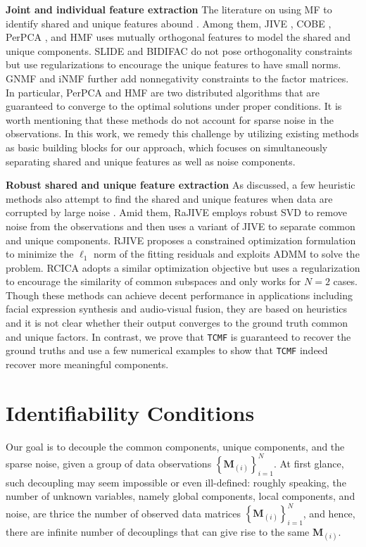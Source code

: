 \documentclass[twoside,11pt]{article}
\def\name{\texttt{TCMF}\xspace}
\newcommand{\matM}{\mathbf{M}}
\begin{document}
\textbf{Joint and individual feature extraction} The literature on using MF to identify shared and unique features abound \citep{jive,cobe, slide,bidifac, groupnmf,inmf, personalizedpca, perdl,hmf}. Among them, JIVE \citep{jive}, COBE \citep{cobe}, PerPCA \citep{personalizedpca},  and HMF \citep{hmf} uses mutually orthogonal features to model the shared and unique components. SLIDE \citep{slide} and BIDIFAC \citep{bidifac} do not pose orthogonality constraints but use regularizations to encourage the unique features to have small norms. GNMF \citep{groupnmf} and iNMF \citep{inmf} further add nonnegativity constraints to the factor matrices. In particular, PerPCA \citep{personalizedpca} and HMF \citep{hmf} are two distributed algorithms that are guaranteed to converge to the optimal solutions under proper conditions. It is worth mentioning that these methods do not account for sparse noise in the observations. In this work, we remedy this challenge by utilizing existing methods as basic building blocks for our approach, which focuses on simultaneously separating shared and unique features as well as noise components.

\textbf{Robust shared and unique feature extraction} As discussed, a few heuristic methods also attempt to find the shared and unique features when data are corrupted by large noise \citep{rjive,rajive,rcica}. Amid them, RaJIVE \citep{rajive} employs robust SVD \citep{robustsvd} to remove noise from the observations and then uses a variant of JIVE \citep{ajive} to separate common and unique components. RJIVE \citep{rjive} proposes a constrained optimization formulation to minimize the $\ell_1$ norm of the fitting residuals and exploits ADMM to solve the problem. RCICA \citep{rcica} adopts a similar optimization objective but uses a regularization to encourage the similarity of common subspaces and only works for $N=2$ cases. Though these methods can achieve decent performance in applications including facial expression synthesis and audio-visual fusion, they are based on heuristics and it is not clear whether their output converges to the ground truth common and unique factors. In contrast, we prove that \name is guaranteed to recover the ground truths and use a few numerical examples to show that \name indeed recover more meaningful components.

\section{Identifiability Conditions}\label{sec_identifiability}
Our goal is to decouple the common components, unique components, and the sparse noise, given a group of data observations $\left\{\matM_{(i)}\right\}_{i=1}^N$.
At first glance, such decoupling may seem impossible or even ill-defined: roughly speaking, the number of unknown variables, namely global components, local components, and noise, are thrice the number of observed data matrices $\left\{\matM_{(i)}\right\}_{i=1}^N$, and hence, there are infinite number of decouplings that can give rise to the same $\matM_{(i)}$. 
\end{document}
